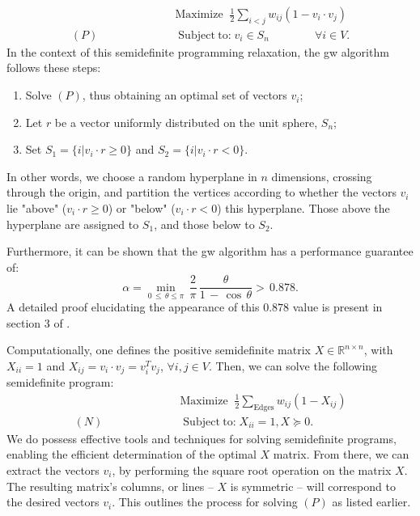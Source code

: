 \begin{equation}
  \begin{split}
  &\mathrm{Maximize}\;\;\frac{1}{2}\sum_{i<j}w_{i j}(1-v_{i} \cdot v_{j}) \\
  (P)\qquad\qquad\qquad&\operatorname{Subject\;to:}v_{i}\in S_n \qquad\qquad\forall i\in V.
  \end{split}
\end{equation}
In the context of this semidefinite programming relaxation, the \acrshort{gw} algorithm follows these steps:
\begin{enumerate}
  \item Solve $(P)$, thus obtaining an optimal set of vectors $v_{i}$;
  \item Let $r$ be a vector uniformly distributed on the unit sphere, $S_n$;
  \item Set $S_1 = \{i|v_{i} \cdot r \geq 0\}$ and $S_2 = \{i|v_{i} \cdot r < 0\}$.
\end{enumerate}
In other words, we choose a random hyperplane in $n$ dimensions, crossing through the origin, and partition the vertices according to whether the vectors $v_{i}$ lie "above" ($v_{i} \cdot r \geq 0$) or "below" ($v_{i} \cdot r < 0$) this hyperplane. Those above the hyperplane are assigned to $S_1$, and those below to $S_2$.

Furthermore, it can be shown that the \acrshort{gw} algorithm has a performance guarantee of:
\begin{equation}
  \alpha=\operatorname*{min}_{0\,\leq\,\theta\leq\pi}\,\frac{2}{\pi}\,\frac{\theta}{1\,-\,\cos\,\theta} > \,0.878.
\end{equation}
A detailed proof elucidating the appearance of this $0.878$ value is present in section $3$ of \cite{GW-Algorithm}.

Computationally, one defines the positive semidefinite matrix $X \in \mathbb{R}^{n \times n}$, with $X_{ii} = 1$ and $X_{ij} = v_{i} \cdot v_{j} = v_{i}^{T} v_j$, $\forall i, j \in V$. Then, we can solve the following semidefinite program:
\begin{equation}
  \begin{split}
  &\mathrm{Maximize}\;\;\frac{1}{2}\sum_{\text{Edges}}w_{i j}(1-X_{ij}) \\
  (N)\qquad\qquad\qquad&\operatorname{Subject\;to:}X_{ii} = 1, X \succeq 0.
  \end{split}
\end{equation}
We do possess effective tools and techniques for solving semidefinite programs, enabling the efficient determination of the optimal $X$ matrix. From there, we can extract the vectors $v_{i}$, by performing the square root operation on the matrix $X$. The resulting matrix's columns, or lines – $X$ is symmetric – will correspond to the desired vectors $v_{i}$. This outlines the process for solving $(P)$ as listed earlier.

